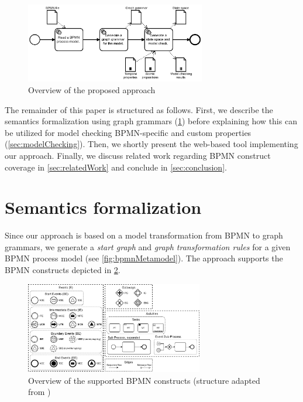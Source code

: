 \documentclass[submission, copyright, creativecommons]{eptcs}
\begin{document}
\begin{figure}[h]
    \centering
    \includegraphics[width=0.7\textwidth]{images/full-approach.pdf}
    \caption{Overview of the proposed approach}
    \label{fig:approach}
\end{figure}

The remainder of this paper is structured as follows.
First, we describe the semantics formalization using graph grammars (\cref{sec:formalization}) before explaining how this can be utilized for model checking BPMN-specific and custom properties (\cref{sec:modelChecking}).
Then, we shortly present the web-based tool implementing our approach.
Finally, we discuss related work regarding BPMN construct coverage in \cref{sec:relatedWork} and conclude in \cref{sec:conclusion}.

\section{Semantics formalization} \label{sec:formalization}

Since our approach is based on a model transformation from BPMN to graph grammars, we generate a \emph{start graph} and \emph{graph transformation rules} for a given BPMN process model (see \cref{fig:bpmnMetamodel}).
The approach supports the BPMN constructs depicted in \cref{fig:bpmnConstructsOverview}.

\begin{figure}[h]
    \centering
    \includegraphics[width=0.69\textwidth]{images/bpmn_semantics-feature_overview.pdf}
    \caption{Overview of the supported BPMN constructs (structure adapted from \cite{houhouFirstOrderLogicVerification2022})}
    \label{fig:bpmnConstructsOverview}
\end{figure}
\end{document}
